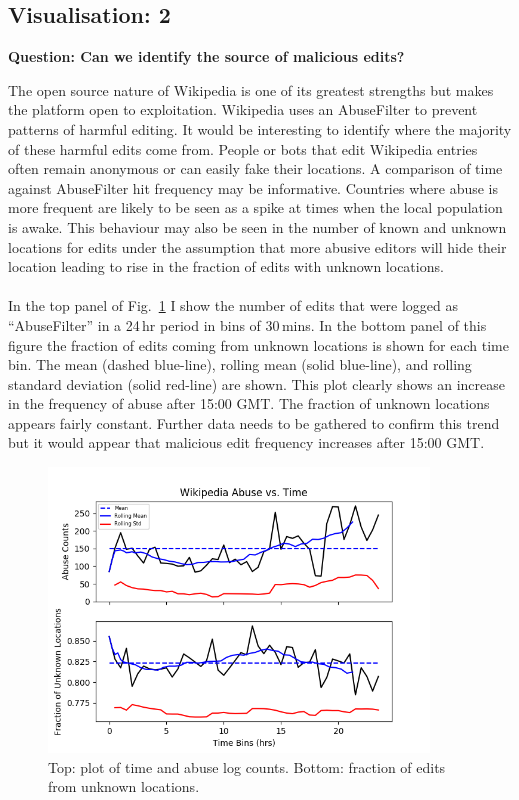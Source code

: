 \documentclass[a4paper, 12pt]{article}
\begin{document}
\newpage
\subsection*{Visualisation: 2}

\textbf{Question: Can we identify the source of malicious edits?}

\noindent The open source nature of Wikipedia is one of its greatest strengths but makes the platform open to exploitation. Wikipedia uses an AbuseFilter to prevent patterns of harmful editing. It would be interesting to identify where the majority of these harmful edits come from. People or bots that edit Wikipedia entries often remain anonymous or can easily fake their locations. A comparison of time against AbuseFilter hit frequency may be informative. Countries where abuse is more frequent are likely to be seen as a spike at times when the local population is awake. This behaviour may also be seen in the number of known and unknown locations for edits under the assumption that more abusive editors will hide their location leading to rise in the fraction of edits with unknown locations. 
\\
\\
\noindent In the top panel of Fig.~\ref{im:2} I show the number of edits that were logged as ``AbuseFilter'' in a 24\,hr period in bins of 30\,mins. In the bottom panel of this figure the fraction of edits coming from unknown locations is shown for each time bin. The mean (dashed blue-line), rolling mean (solid blue-line), and rolling standard deviation (solid red-line) are shown. This plot clearly shows an increase in the frequency of abuse after 15:00 GMT. The fraction of unknown locations appears fairly constant. Further data needs to be gathered to confirm this trend but it would appear that malicious edit frequency increases after 15:00 GMT.

\begin{figure}[h]
\begin{center}
\includegraphics[width=0.9\textwidth]{./IMAGES/abuse.png} 
\caption{Top: plot of time and abuse log counts. Bottom: fraction of edits from unknown locations.}
\label{im:2}
\end{center}
\end{figure}
\end{document}
